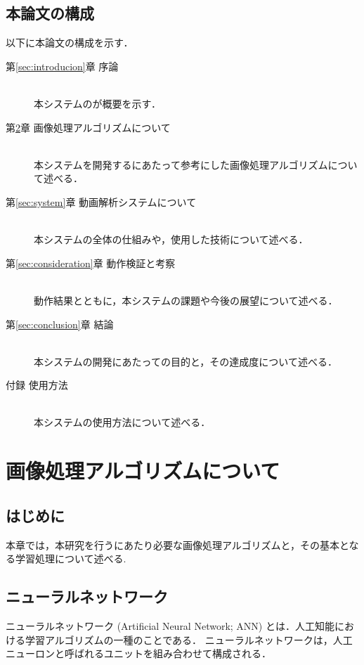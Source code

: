 \documentclass[a4j,12pt,dvipdfmx]{jreport}
\begin{document}
\clearpage

\section{本論文の構成}
以下に本論文の構成を示す．
\begin{description}
\item[第\ref{sec:introducion}章 \qquad 序論]\mbox{}\\
本システムのが概要を示す．

\item[第\ref{sec:algorithm}章 \qquad 画像処理アルゴリズムについて]\mbox{}\\
本システムを開発するにあたって参考にした画像処理アルゴリズムについて述べる．

\item[第\ref{sec:system}章 \qquad 動画解析システムについて]\mbox{}\\
本システムの全体の仕組みや，使用した技術について述べる．

\item[第\ref{sec:consideration}章 \qquad 動作検証と考察]\mbox{}\\
動作結果とともに，本システムの課題や今後の展望について述べる．

\item[第\ref{sec:conclusion}章 \qquad 結論]\mbox{}\\
本システムの開発にあたっての目的と，その達成度について述べる．

\item[付録 \qquad 使用方法]\mbox{}\\
本システムの使用方法について述べる．
\end{description}

\clearpage

\chapter{画像処理アルゴリズムについて}
\label{sec:algorithm}

\section{はじめに}
本章では，本研究を行うにあたり必要な画像処理アルゴリズムと，その基本となる学習処理について述べる\cite{ms_tamura,ANN,G}.

\section{ニューラルネットワーク}
ニューラルネットワーク (Artificial Neural Network; ANN) とは．人工知能における学習アルゴリズムの一種のことである．
ニューラルネットワークは，人工ニューロンと呼ばれるユニットを組み合わせて構成される．
\end{document}
